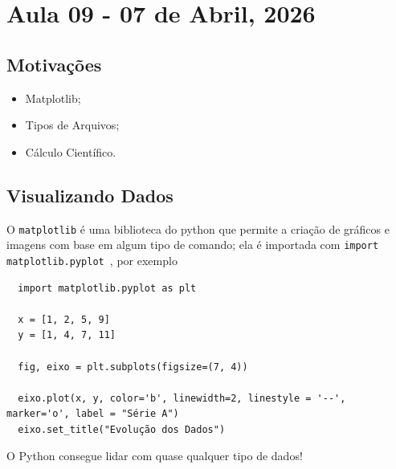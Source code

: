 \documentclass[../numerical_methods.tex]{subfiles}
\begin{document}
\section{Aula 09 - 07 de Abril, 2026}
\subsection{Motivações}
\begin{itemize}
	\item Matplotlib;
	\item Tipos de Arquivos;
	\item Cálculo Científico.
\end{itemize}
\subsection{Visualizando Dados}
O \texttt{matplotlib} é uma biblioteca do python que permite a criação de gráficos e imagens com base em algum tipo de comando; ela é importada com \texttt{import matplotlib.pyplot }, por exemplo
\begin{listing}[H]
	\begin{verbatim}
  import matplotlib.pyplot as plt

  x = [1, 2, 5, 9] 
  y = [1, 4, 7, 11]

  fig, eixo = plt.subplots(figsize=(7, 4))

  eixo.plot(x, y, color='b', linewidth=2, linestyle = '--', marker='o', label = "Série A")
  eixo.set_title("Evolução dos Dados")

  \end{verbatim}
\end{listing}
O Python consegue lidar com quase qualquer tipo de dados!
\end{document}
